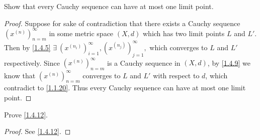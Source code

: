 \begin{ex}\label{ex:1.4.6}
  Show that every Cauchy sequence can have at most one limit point.
\end{ex}

\begin{proof}
  Suppose for sake of contradiction that there exists a Cauchy sequence \((x^{(n)})_{n = m}^\infty\) in some metric space \((X, d)\) which has two limit points \(L\) and \(L'\).
  Then by \cref{1.4.5} \(\exists\ (x^{(n_i)})_{i = 1}^\infty, (x^{(n_j)})_{j = 1}^\infty,\) which converges to \(L\) and \(L'\) respectively.
  Since \((x^{(n)})_{n = m}^\infty\) is a Cauchy sequence in \((X, d)\), by \cref{1.4.9} we know that \((x^{(n)})_{n = m}^\infty\) converges to \(L\) and \(L'\) with respect to \(d\), which contradict to \cref{1.1.20}.
  Thus every Cauchy sequence can have at most one limit point.
\end{proof}

\begin{ex}\label{ex:1.4.7}
  Prove \cref{1.4.12}.
\end{ex}

\begin{proof}
  See \cref{1.4.12}.
\end{proof}

